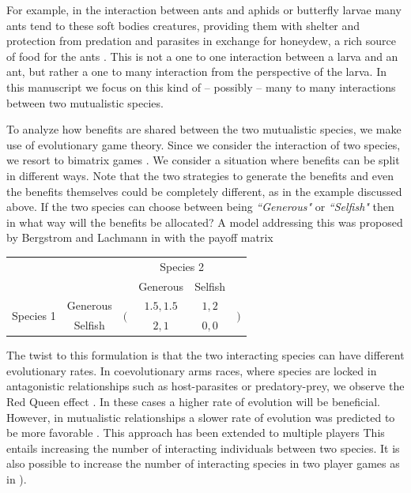 \documentclass{pnastwo}
\begin{document}
\begin{article}
For example, in the interaction between ants and aphids or butterfly larvae \cite{pierce:BES:1987,hoelldobler:book:1990} many ants tend to these soft bodies creatures, providing them with shelter and protection from predation and parasites in exchange for honeydew, a rich source of food for the ants \cite{hill:OEC:1989,stadler:book:2008}.
This is not a one to one interaction between a larva and an ant, but rather a one to many interaction from the perspective of the larva.
In this manuscript we focus on this kind of -- possibly -- many to many interactions between two mutualistic species.



To analyze how benefits are shared between the two mutualistic species, we make use of evolutionary game theory.
Since we consider the interaction of two species, we resort to bimatrix games
\cite{weibull:book:1995,hofbauer:JMB:1996,hofbauer:book:1998}.
We consider a situation where benefits can be split in different ways.
Note that the two strategies to generate the benefits and even the benefits themselves
could be completely different, as in the example discussed above. 
If the two species can choose between being \textit{``Generous"} or \textit{``Selfish"}  then in what way will the benefits be allocated?
A model addressing this was proposed by Bergstrom and Lachmann in \cite{bergstrom:PNAS:2003} with the payoff matrix
%
\begin{center}
\begin{tabular}{cccccc}
& & & \multicolumn{2}{c}{Species 2} &\\
& & & Generous & Selfish &\\
\multirow{2}{*}{Species 1}& Generous
& \multirow{2}{*}{$\bigg($} & $1.5, 1.5$ & $1, 2$ & \multirow{2}{*}{$\bigg)$}\\
& Selfish & & $2, 1$ & $0, 0$ &\ \ .
\end{tabular}
\end{center}
%
The twist to this formulation is that the two interacting species can have different evolutionary rates.
In coevolutionary arms races, where species are locked in antagonistic relationships such as host-parasites or predatory-prey, we observe the Red Queen effect
\cite{vanValen:EvoTheo:1973}.
In these cases a higher rate of evolution will be beneficial.
However, in mutualistic relationships a slower rate of evolution was predicted to be more favorable \cite{bergstrom:PNAS:2003}.
This approach has been extended to multiple players \cite{gokhale:PRSB:2012}
This entails increasing the number of interacting individuals between two species. 
It is also possible to increase the number of interacting species in two player games as in \cite{mack:OIKOS:2008,damore:Evolution:2011,wang:JRSI:2011}).


\end{article}
\end{document}
